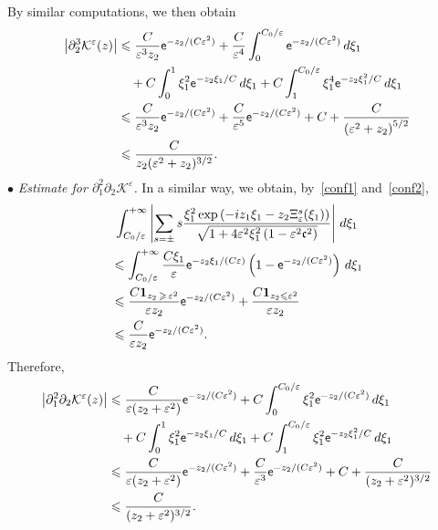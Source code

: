 \documentclass[10pt]{amsart}
\theoremstyle{definition}\newtheorem{defi}[theo]{Definition}\newtheorem{rema}[theo]{Remark}\newtheorem{exam}[theo]{Example}\newtheorem{exem}[theo]{Example}\newtheorem{nota}[theo]{Notation}
\newcommand*\p{\partial}
\newcommand*\BK{\mathcal{K}}
\newcommand{\bfun}{\mathbf{1}}
\newcommand*\ex{{\sf e}}
\newcommand*\cs{{\mathfrak c}}
\newcommand*\ii{\infty}
\newcommand*\gs{\geqslant }
\newcommand*\ls{\leqslant }
\newcommand*\e{\varepsilon}
\begin{document}
By similar computations, we then obtain
\begin{align*}
\left\lvert \p_2^3 \BK^\e (z) \right\rvert &
\ls \frac{C}{\e^3 z_2 } \ex^{ - z_2 / (C\e^2) } + \frac{ C}{\e^4} \int_0^{ C_0 / \e } \ex^{- z_2 / (C \e^2) } \, d\xi_1\\ 
& \quad + C \int_0^{1} \xi_1^2 \ex^{- z_2 \xi_1 / C } \, d\xi_1 + C \int_1^{ C_0 / \e } \xi_1^4 \ex^{- z_2 \xi_1^2 / C } \, d\xi_1
\\ &
\ls \frac{C}{\e^3 z_2 } \ex^{ - z_2 / (C\e^2) } + \frac{C}{\e^5} \ex^{- z_2 / (C \e^2) } + C + \frac{C}{\left(\e^2 + z_2\right)^{5/2} }
\\ &
\ls \frac{C}{ z_2 (\e^2 + z_2)^{3/2}}.
\end{align*}
$ \bullet $ \emph{Estimate for $ \p_1^2 \p_2 \BK^\e $.} In a similar way, we obtain, by~\eqref{conf1} and~\eqref{conf2},
\begin{multline*}
\int_{ C_0 / \e }^{+\ii}  \left\lvert \sum_{ s = \pm} s
\frac{ \xi_1^2 \exp\left(- iz_1 \xi_1 - z_2 \Xi_\e^s (\xi_1)\right)}{\sqrt{1 + 4 \e^2 \xi_1^2 \left(1 - \e^2 \cs^2\right)}} \right\rvert \, d\xi_1
\\
\begin{aligned}
& \ls \int_{ C_0 / \e }^{+\ii} \frac{ C\xi_1 }{ \e } \ex^{ - z_2 \xi_1/ (C\e) } \left(1 - \ex^{ - z_2 /(C\e^2) }\right) \, d\xi_1
\\ &
\ls \frac{C \bfun_{z_2\,\gs\,\e^2 } }{ \e z_2 } \ex^{ - z_2 / (C\e^2) } + \frac{C \bfun_{z_2 \ls \e^2 } }{ \e z_2 }
\\ &
\ls \frac{ C}{\e z_2 } \ex^{ - z_2 /(C\e^2) }.
\end{aligned}
\end{multline*}
Therefore,
\begin{align*}
\left\lvert \p_1^2 \p_2 \BK^\e (z) \right\rvert &
\ls \frac{ C}{\e (z_2 + \e^2) } \ex^{ - z_2 /(C\e^2) } + C \int_0^{ C_0 /\e } \xi_1^2 \ex^{- z_2 / (C \e^2) } \, d\xi_1
\\ & \quad + C \int_0^{1} \xi_1^2 \ex^{- z_2 \xi_1 / C } \, d\xi_1 + C \int_1^{ C_0 / \e } \xi_1^2 \ex^{- z_2 \xi_1^2 / C } \, d\xi_1
\\ &
\ls \frac{ C}{\e (z_2 + \e^2) } \ex^{ - z_2 /(C\e^2) } + \frac{C}{\e^3} \ex^{- z_2 / (C \e^2) } + C + \frac{C}{ (z_2 + \e^2)^{3/2} }
\\ &
\ls \frac{C}{ (z_2 + \e^2)^{3/2} }.
\end{align*}
\end{document}
